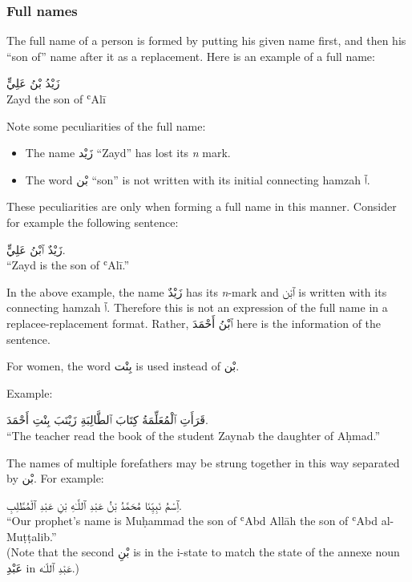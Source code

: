 \documentclass[
  10pt,
]{book}
\providecommand{\tightlist}{%
  \setlength{\itemsep}{0pt}\setlength{\parskip}{0pt}}
\begin{document}
\subsubsection{Full names}\label{full-names}

The full name of a person is formed by putting his given name first, and then his \enquote{son of} name after it as a replacement. Here is an example of a full name:

\foreignlanguage{arabic}{زَيْدُ بْنُ عَلِيٍّ}\\
Zayd the son of ʿAlī

Note some peculiarities of the full name:

\begin{itemize}
\tightlist
\item
  The name \foreignlanguage{arabic}{زَيْد} \enquote{Zayd} has lost its \emph{n} mark.
\item
  The word \foreignlanguage{arabic}{بْن} \enquote{son} is not written with its initial connecting hamzah \foreignlanguage{arabic}{ٱ}.
\end{itemize}

These peculiarities are only when forming a full name in this manner. Consider for example the following sentence:

\foreignlanguage{arabic}{زَيْدٌ ٱبْنُ عَلِيٍّ.}\\
\enquote{Zayd is the son of ʿAlī.}

In the above example, the name \foreignlanguage{arabic}{زَيْدٌ} has its \emph{n}-mark and \foreignlanguage{arabic}{ٱبْن} is written with its connecting hamzah \foreignlanguage{arabic}{ٱ}. Therefore this is not an expression of the full name in a replacee-replacement format. Rather, \foreignlanguage{arabic}{ٱبْنُ أَحْمَدَ} here is the information of the sentence.

For women, the word \foreignlanguage{arabic}{بِنْت} is used instead of \foreignlanguage{arabic}{بْن}.

Example:

\foreignlanguage{arabic}{قَرَأَتِ ٱلْمُعَلِّمَةُ کِتَابَ ٱلطَّالِبَةِ زَيْنَبَ بِنْتِ أَحْمَدَ.}\\
\enquote{The teacher read the book of the student Zaynab the daughter of Aḥmad.}

The names of multiple forefathers may be strung together in this way separated by \foreignlanguage{arabic}{بْن}. For example:

\foreignlanguage{arabic}{ٱِسْمُ نَبِيِّنَا مُحَمَّدُ بْنُ عَبْدِ ٱللَّـٰهِ بْنِ عَبْدِ ٱلْمُطَّلِبِ.}\\
\enquote{Our prophet's name is Muḥammad the son of ʿAbd Allāh the son of ʿAbd al-Muṭṭalib.}\\
(Note that the second \foreignlanguage{arabic}{بْنِ} is in the i-state to match the state of the annexe noun \foreignlanguage{arabic}{عَبْدِ} in \foreignlanguage{arabic}{عَبْدِ ٱللّـٰه}.)
\end{document}
